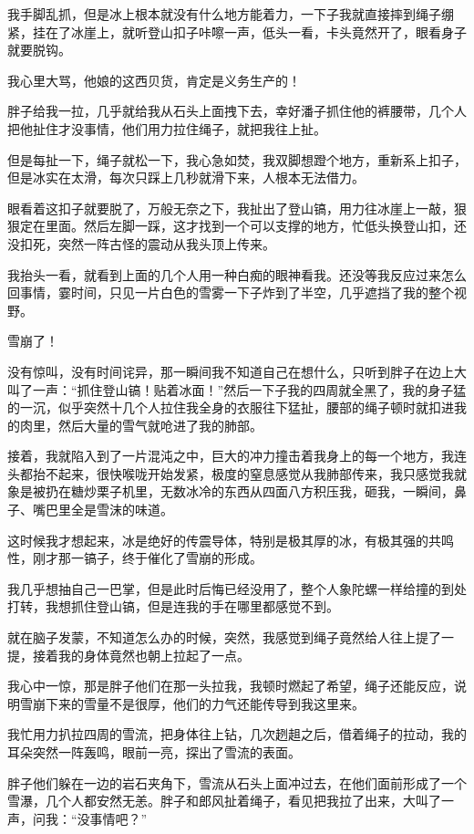 我手脚乱抓，但是冰上根本就没有什么地方能着力，一下子我就直接摔到绳子绷紧，挂在了冰崖上，就听登山扣子咔嚓一声，低头一看，卡头竟然开了，眼看身子就要脱钩。

我心里大骂，他娘的这西贝货，肯定是义务生产的！

胖子给我一拉，几乎就给我从石头上面拽下去，幸好潘子抓住他的裤腰带，几个人把他扯住才没事情，他们用力拉住绳子，就把我往上扯。

但是每扯一下，绳子就松一下，我心急如焚，我双脚想蹬个地方，重新系上扣子，但是冰实在太滑，每次只踩上几秒就滑下来，人根本无法借力。

眼看着这扣子就要脱了，万般无奈之下，我扯出了登山镐，用力往冰崖上一敲，狠狠定在里面。然后左脚一踩，这才找到一个可以支撑的地方，忙低头换登山扣，还没扣死，突然一阵古怪的震动从我头顶上传来。

我抬头一看，就看到上面的几个人用一种白痴的眼神看我。还没等我反应过来怎么回事情，霎时间，只见一片白色的雪雾一下子炸到了半空，几乎遮挡了我的整个视野。

雪崩了！

没有惊叫，没有时间诧异，那一瞬间我不知道自己在想什么，只听到胖子在边上大叫了一声：“抓住登山镐！贴着冰面！”然后一下子我的四周就全黑了，我的身子猛的一沉，似乎突然十几个人拉住我全身的衣服往下猛扯，腰部的绳子顿时就扣进我的肉里，然后大量的雪气就呛进了我的肺部。

接着，我就陷入到了一片混沌之中，巨大的冲力撞击着我身上的每一个地方，我连头都抬不起来，很快喉咙开始发紧，极度的窒息感觉从我肺部传来，我只感觉我就象是被扔在糖炒栗子机里，无数冰冷的东西从四面八方积压我，砸我，一瞬间，鼻子、嘴巴里全是雪沫的味道。

这时候我才想起来，冰是绝好的传震导体，特别是极其厚的冰，有极其强的共鸣性，刚才那一镐子，终于催化了雪崩的形成。

我几乎想抽自己一巴掌，但是此时后悔已经没用了，整个人象陀螺一样给撞的到处打转，我想抓住登山镐，但是连我的手在哪里都感觉不到。

就在脑子发蒙，不知道怎么办的时候，突然，我感觉到绳子竟然给人往上提了一提，接着我的身体竟然也朝上拉起了一点。

我心中一惊，那是胖子他们在那一头拉我，我顿时燃起了希望，绳子还能反应，说明雪崩下来的雪量不是很厚，他们的力气还能传导到我这里来。

我忙用力扒拉四周的雪流，把身体往上钻，几次趔趄之后，借着绳子的拉动，我的耳朵突然一阵轰鸣，眼前一亮，探出了雪流的表面。

胖子他们躲在一边的岩石夹角下，雪流从石头上面冲过去，在他们面前形成了一个雪瀑，几个人都安然无恙。胖子和郎风扯着绳子，看见把我拉了出来，大叫了一声，问我：“没事情吧？”

